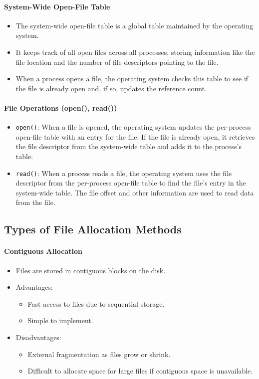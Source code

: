 \paragraph{System-Wide Open-File Table}
\begin{itemize}
    \item The system-wide open-file table is a global table maintained by the operating system.
    \item It keeps track of all open files across all processes, storing information like the file location and the number of file descriptors pointing to the file.
    \item When a process opens a file, the operating system checks this table to see if the file is already open and, if so, updates the reference count.
\end{itemize}

\paragraph{File Operations (open(), read())}
\begin{itemize}
    \item \texttt{open()}: When a file is opened, the operating system updates the per-process open-file table with an entry for the file. If the file is already open, it retrieves the file descriptor from the system-wide table and adds it to the process's table.
    \item \texttt{read()}: When a process reads a file, the operating system uses the file descriptor from the per-process open-file table to find the file’s entry in the system-wide table. The file offset and other information are used to read data from the file.
\end{itemize}


\subsection*{Types of File Allocation Methods}

\paragraph{Contiguous Allocation}
\begin{itemize}
    \item Files are stored in contiguous blocks on the disk.
    \item Advantages:
    \begin{itemize}
        \item Fast access to files due to sequential storage.
        \item Simple to implement.
    \end{itemize}
    \item Disadvantages:
    \begin{itemize}
        \item External fragmentation as files grow or shrink.
        \item Difficult to allocate space for large files if contiguous space is unavailable.
    \end{itemize}
\end{itemize}

